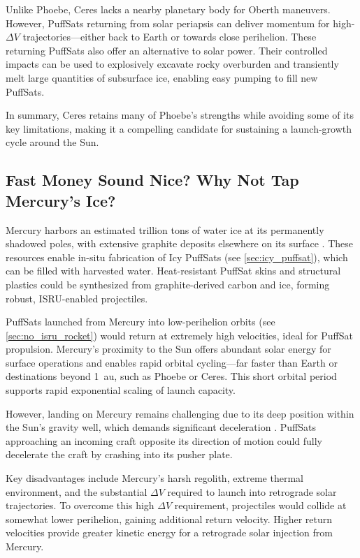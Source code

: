 \documentclass{article}
\begin{document}
Unlike Phoebe, Ceres lacks a nearby planetary body for Oberth maneuvers. However, PuffSats returning from solar periapsis can deliver momentum for high-$\Delta V$ trajectories—either back to Earth or towards close perihelion. These returning PuffSats also offer an alternative to solar power. Their controlled impacts can be used to explosively excavate rocky overburden and transiently melt large quantities of subsurface ice, enabling easy pumping to fill new PuffSats.

In summary, Ceres retains many of Phoebe’s strengths while avoiding some of its key limitations, making it a compelling candidate for sustaining a launch-growth cycle around the Sun.

\subsection{Fast Money Sound Nice?  Why Not Tap Mercury's Ice?}
Mercury harbors an estimated trillion tons of water ice at its permanently shadowed poles, with extensive graphite deposits elsewhere on its surface \cite{wikipediaMercuryPlanet}. These resources enable in-situ fabrication of Icy PuffSats (see \autoref{sec:icy_puffsat}), which can be filled with harvested water. Heat-resistant PuffSat skins and structural plastics could be synthesized from graphite-derived carbon and ice, forming robust, ISRU-enabled projectiles.

PuffSats launched from Mercury into low-perihelion orbits (see \autoref{sec:no_isru_rocket}) would return at extremely high velocities, ideal for PuffSat propulsion. Mercury’s proximity to the Sun offers abundant solar energy for surface operations and enables rapid orbital cycling---far faster than Earth or destinations beyond \SI{1}{\astronomicalunit}, such as Phoebe or Ceres. This short orbital period supports rapid exponential scaling of launch capacity.

However, landing on Mercury remains challenging due to its deep position within the Sun’s gravity well, which demands significant deceleration \cite{lewis2025bepicolombo}. PuffSats approaching an incoming craft opposite its direction of motion could fully decelerate the craft by crashing into its pusher plate.

Key disadvantages include Mercury’s harsh regolith, extreme thermal environment, and the substantial $\Delta V$ required to launch into retrograde solar trajectories. To overcome this high $\Delta V$ requirement, projectiles would collide at somewhat lower perihelion, gaining additional return velocity.  Higher return velocities provide greater kinetic energy for a retrograde solar injection from Mercury.
\end{document}
